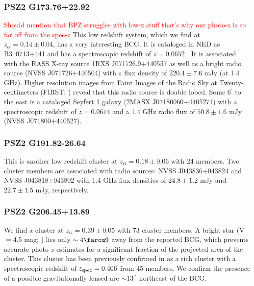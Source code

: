 \documentclass[apj, revtex4-1]{emulateapj}
\newcommand{\editorial}[1]{\textcolor{red}{#1}}
\begin{document}
\subsubsection{PSZ2 G173.76+22.92} %
\editorial{Should mention that BPZ struggles with low-z stuff that's why our photo-z is so far off from the spec-z}
This low redshift system, which we find at $z_{cl} = 0.14 \pm 0.04$, has a very interesting BCG.  It is cataloged in NED as B3~0713+441 and has a spectroscopic redshift of $z=0.0652$ \citep{Bauer2000}. It is associated with the RASS X-ray source 1RXS J071726.9+440557 as well as a bright radio source (NVSS J071726+440504) with a flux density of $220.4\pm 7.6$ mJy (at 1.4 GHz).  Higher resolution images from Faint Images of the Radio Sky at Twenty-centimeters (FIRST; \citealt{Becker1995}) reveal that this radio source is double lobed.  Some 6$^\prime$ to the east is a cataloged Seyfert 1 galaxy (2MASX J07180060+4405271) with a spectroscopic redshift of $z=0.0614$ \citep{Michel1988} and a 1.4 GHz radio flux of $50.8 \pm 1.6 $ mJy (NVSS J071800+440527).


\subsubsection{PSZ2 G191.82-26.64} %
This is another low redshift cluster at $z_{cl} = 0.18 \pm 0.06$ with 24 members. Two cluster members are associated with radio sources: NVSS J043836+043824 and NVSS J043818+043802 with 1.4 GHz flux densities of $24.8 \pm 1.2$ mJy and $22.7 \pm 1.5$ mJy, respectively.

\subsubsection{PSZ2 G206.45+13.89}  %
We find a cluster at $z_{cl} = 0.39 \pm 0.05$ with 73 cluster members.  A bright star (V $= 4.5$ mag; \citealt{Hog2000}) lies only $\sim4\farcm9$ away from the reported BCG, which prevents accurate photo-$z$ estimates for a significant fraction of the projected area of the cluster. This cluster has been previously confirmed in \citet{Barrena2018} as a rich cluster with a spectroscopic redshift of $z_{\rm spec} = 0.406$ from 45 members. We confirm the presence of a possible gravitationally-lensed arc $\sim$13$^{\prime\prime}$ northeast of the BCG.
\end{document}
